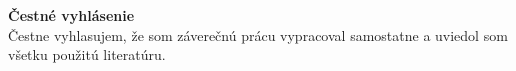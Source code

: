 \makeatletter
\thispagestyle{empty}
\vspace*{\fill}
\begin{flushleft}
    \textbf{Čestné vyhlásenie}\\[1em]
    \hspace*{1.5em}Čestne vyhlasujem, že som záverečnú prácu vypracoval samostatne a uviedol som všetku použitú literatúru.
\end{flushleft}
\vspace{1em}
\begin{flushright}
    \makebox[60mm][c]{\dotfill}
\end{flushright}
\clearpage
\makeatother
